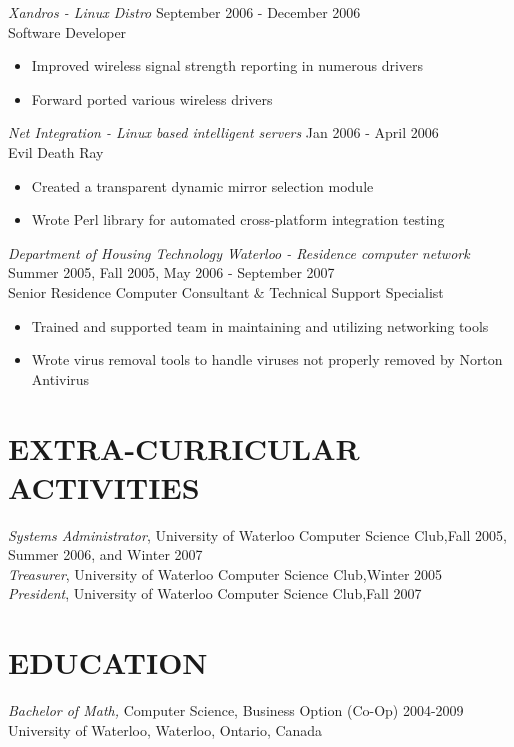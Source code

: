 \documentclass[10pt,line,margin=0.1]{newsres}
\begin{document}
\begin{resume}
        {\sl Xandros - Linux Distro} \hfill September 2006 - December 2006 \\
        Software Developer
        \begin{itemize}  \itemsep -2pt %
        \item{Improved wireless signal strength reporting in numerous drivers}
        \item{Forward ported various wireless drivers}
        \end{itemize}
        {\sl Net Integration - Linux based intelligent servers} \hfill Jan 2006 - April 2006 \\
        Evil Death Ray
        \begin{itemize}  \itemsep -2pt %
        \item{Created a transparent dynamic mirror selection module}
        \item{Wrote Perl library for automated cross-platform integration testing}
        \end{itemize}
        {\sl Department of Housing Technology Waterloo - Residence computer network} \hfill Summer 2005, Fall 2005, May 2006 - September 2007 \\
        Senior Residence Computer Consultant \& Technical Support Specialist
        \begin{itemize} \itemsep -2pt %
        \item{Trained and supported team in maintaining and utilizing networking tools}
        \item{Wrote virus removal tools to handle viruses not properly removed by Norton Antivirus}
        \end{itemize}

 
\section{EXTRA-CURRICULAR \\ ACTIVITIES}             
        {\it Systems Administrator}, University of Waterloo Computer Science Club,\hfill  Fall 2005, Summer 2006, and Winter 2007 \\
        {\it Treasurer}, University of Waterloo Computer Science Club,\hfill Winter 2005 \\
        {\it President}, University of Waterloo Computer Science Club,\hfill Fall 2007 \\

\section{EDUCATION} {\sl Bachelor of Math,} Computer Science, Business Option (Co-Op) 2004-2009 \\
                University of Waterloo, Waterloo, Ontario, Canada
\end{resume}
\end{document}
